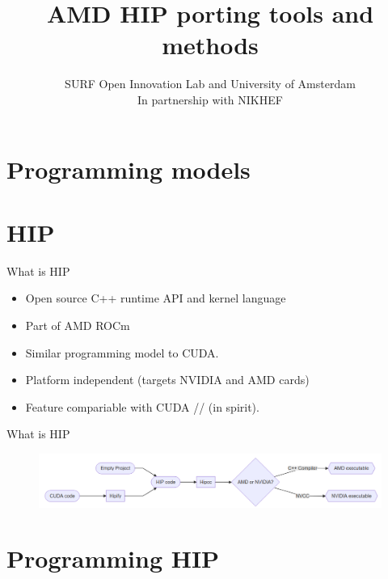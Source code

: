 \documentclass[aspectratio=169]{beamer}
\title{AMD HIP porting tools and methods}
\author{SURF Open Innovation Lab and University of Amsterdam
				\\In partnership with NIKHEF}
\date{}
\begin{document}
\newcommand{\rom}[1]{\uppercase\expandafter{\romannumeral #1\relax}}
\begin{frame}
\titlepage
\end{frame}




\section{Programming models}


\section{HIP}

\begin{frame}{What is HIP}
    \begin{itemize}
        \item Open source C++ runtime API and kernel language
        \item Part of AMD ROCm
        \item Similar programming model to CUDA.
        \item Platform independent (targets NVIDIA and AMD cards)
        \item Feature compariable with CUDA // (in spirit).
    \end{itemize}
\end{frame}

\begin{frame}{What is HIP}
\begin{figure}
    \centering
    \includegraphics[width=\textwidth]{img/HIP_flow.png}
\end{figure}
\end{frame}

\section{Programming HIP}
\end{document}
